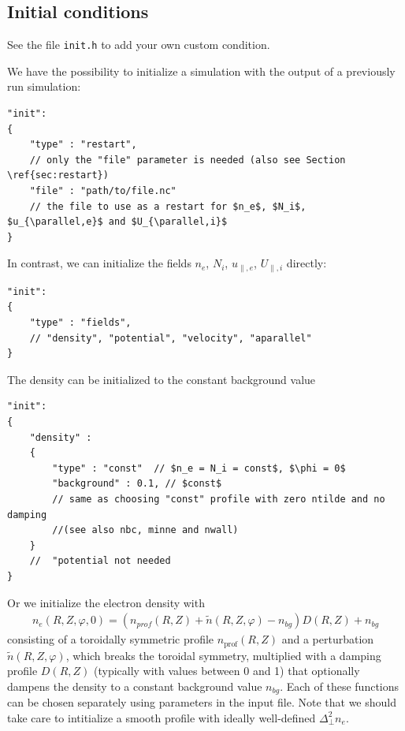 \subsection{Initial conditions} \label{sec:initial}
See the file {\tt init.h} to add your own custom condition.

We have the possibility to
initialize a simulation with the output of a previously
run simulation:
\begin{verbatim}
"init":
{
    "type" : "restart",
    // only the "file" parameter is needed (also see Section \ref{sec:restart})
    "file" : "path/to/file.nc"
    // the file to use as a restart for $n_e$, $N_i$, $u_{\parallel,e}$ and $U_{\parallel,i}$
}
\end{verbatim}
In contrast, we can initialize the fields $n_e$, $N_i$, $u_{\parallel,e}$, $U_{\parallel,i}$
directly:
\begin{verbatim}
"init":
{
    "type" : "fields",
    // "density", "potential", "velocity", "aparallel"
}
\end{verbatim}
The density can be initialized to the constant background value
\begin{verbatim}
"init":
{
    "density" :
    {
        "type" : "const"  // $n_e = N_i = const$, $\phi = 0$
        "background" : 0.1, // $const$
        // same as choosing "const" profile with zero ntilde and no damping
        //(see also nbc, minne and nwall)
    }
    //  "potential not needed
}
\end{verbatim}
Or we initialize the electron density with
\begin{align} \label{eq:initial_ne}
    n_e(R,Z,\varphi, 0)= (n_{prof}(R,Z) + \tilde n(R,Z,\varphi) - n_{bg}) D(R,Z) + n_{bg}
\end{align}
consisting of a toroidally symmetric profile $n_{\text{prof}}(R,Z)$ and a
perturbation $\tilde n(R,Z,\varphi)$, which breaks the toroidal symmetry,
multiplied with a damping profile $D(R,Z)$ (typically with values between 0 and
1) that optionally dampens the density to a constant background value $n_{bg}$.
Each of these functions can be chosen separately using parameters in the input
file.  Note that we should take care to intitialize a smooth profile with
ideally well-defined $\Delta^2_\perp n_e$.

